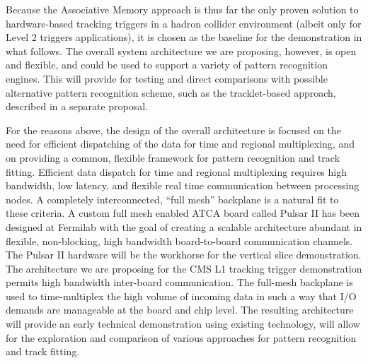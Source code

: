 Because the Associative Memory approach is thus far the only proven solution to hardware-based tracking triggers in a hadron collider environment (albeit only for Level 2 triggers applications), it is chosen as the baseline for the demonstration in what follows.  The overall system architecture we are proposing, however, is open and flexible, and could be used to support a variety of pattern recognition engines.  This will provide for testing and direct comparisons with possible alternative pattern recognition scheme, such as the tracklet-based approach, described in a separate proposal.



	For the reasons above, the design of the overall architecture is focused on the need for efficient dispatching of the data for time and regional multiplexing, and on providing a common, flexible framework for pattern recognition and track fitting. Efficient data dispatch for time and regional multiplexing requires high bandwidth, low latency, and flexible real time communication between processing nodes.  A completely interconnected, ``full mesh'' backplane is a natural fit to these criteria. A custom full mesh enabled ATCA board called Pulsar II has been designed at Fermilab with the goal of creating a scalable architecture abundant in flexible, non-blocking, high bandwidth board-to-board communication channels. The Pulsar II hardware will be the workhorse for the vertical slice demonstration. The architecture we are proposing for the CMS L1 tracking trigger demonstration permits high bandwidth inter-board communication. 
The full-mesh backplane is used to time-multiplex the high volume of incoming data in such a way that I/O demands are manageable at the board and chip level. The resulting architecture will provide an early technical demonstration using existing technology, will allow for the exploration and comparison of various approaches for pattern recognition and track fitting.


